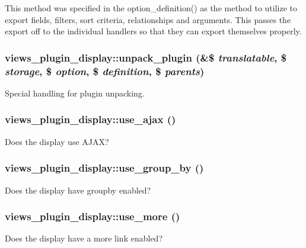 This method was specified in the option\_\-definition() as the method to utilize to export fields, filters, sort criteria, relationships and arguments. This passes the export off to the individual handlers so that they can export themselves properly. \hypertarget{classviews__plugin__display_abffcd71a6d0d188e6d42f790ce7f369d}{
\subsubsection[{unpack\_\-plugin}]{\setlength{\rightskip}{0pt plus 5cm}views\_\-plugin\_\-display::unpack\_\-plugin (\&\$ {\em translatable}, \/  \$ {\em storage}, \/  \$ {\em option}, \/  \$ {\em definition}, \/  \$ {\em parents})}}
\label{classviews__plugin__display_abffcd71a6d0d188e6d42f790ce7f369d}
Special handling for plugin unpacking. \hypertarget{classviews__plugin__display_a7983d89c2a4aabab1df7ceb31d700a3c}{
\subsubsection[{use\_\-ajax}]{\setlength{\rightskip}{0pt plus 5cm}views\_\-plugin\_\-display::use\_\-ajax ()}}
\label{classviews__plugin__display_a7983d89c2a4aabab1df7ceb31d700a3c}
Does the display use AJAX? \hypertarget{classviews__plugin__display_a89f5d783ace86904c3eac7ad114e4b18}{
\subsubsection[{use\_\-group\_\-by}]{\setlength{\rightskip}{0pt plus 5cm}views\_\-plugin\_\-display::use\_\-group\_\-by ()}}
\label{classviews__plugin__display_a89f5d783ace86904c3eac7ad114e4b18}
Does the display have groupby enabled? \hypertarget{classviews__plugin__display_ae1d8ce3a491253cd56c5e8fc1d62c008}{
\subsubsection[{use\_\-more}]{\setlength{\rightskip}{0pt plus 5cm}views\_\-plugin\_\-display::use\_\-more ()}}
\label{classviews__plugin__display_ae1d8ce3a491253cd56c5e8fc1d62c008}
Does the display have a more link enabled? 

